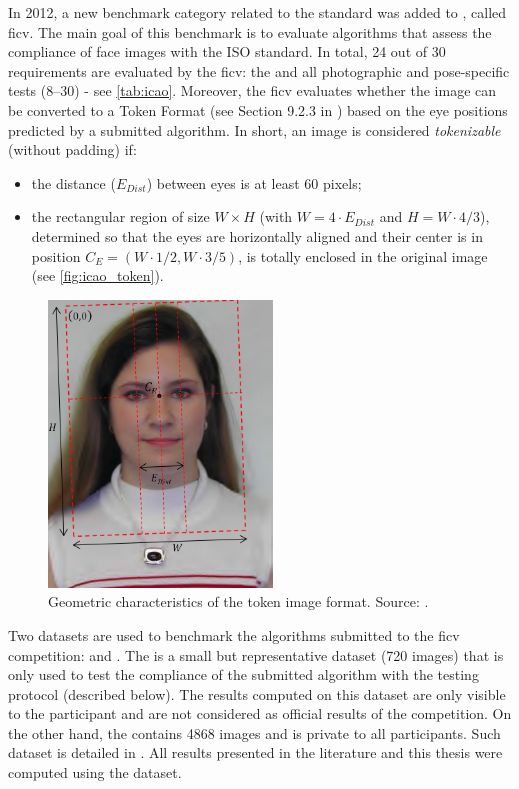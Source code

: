 In 2012, a new benchmark category related to the \icao standard was added to \fvcongoing \citep{ferrara2012face}, called \acf{ficv}. The main goal of this benchmark is to evaluate algorithms that assess the compliance of face images with the ISO standard. In total, 24 out of 30 requirements are evaluated by the \acs{ficv}: the \eyecenterlocation and all photographic and pose-specific tests (8--30) - see \autoref{tab:icao}. Moreover, the \acs{ficv} evaluates whether the image can be converted to a Token Format (see Section 9.2.3 in \citep{iso-iec}) based on the eye positions predicted by a submitted algorithm. In short, an image is considered \textit{tokenizable} (without padding) if:

\begin{itemize}
\item the distance ($E_{Dist}$) between eyes is at least 60 pixels;
\item the rectangular region of size $W \times H$ (with $W=4\cdot E_{Dist}$ and $H=W \cdot 4/3$), determined so that the eyes are horizontally aligned and their center is in position $C_E=(W\cdot1/2,W\cdot3/5)$, is totally enclosed in the original image (see \autoref{fig:icao_token}).
\end{itemize}

\begin{figure}[tb]
    \centering
    \includegraphics[height=3.0in]{images/dataset/icao_tokenizable.png}
    \caption{Geometric characteristics of the token image format. Source: \citep{fvcongoing}.}
    \label{fig:icao_token}
\end{figure}

Two datasets are used to benchmark the algorithms submitted to the \acs{ficv} competition: \ficvtest and \ficvofficial. The \ficvtest is a small but representative dataset (720 images) that is only used to test the compliance of the submitted algorithm with the testing protocol (described below). The results computed on this dataset are only visible to the participant and are not considered as official results of the competition. On the other hand, the \ficvofficial contains 4868 images and is private to all participants. Such dataset is detailed in \cite{ferrara2012face}. All results presented in the literature and this thesis were computed using the \ficvofficial dataset.

